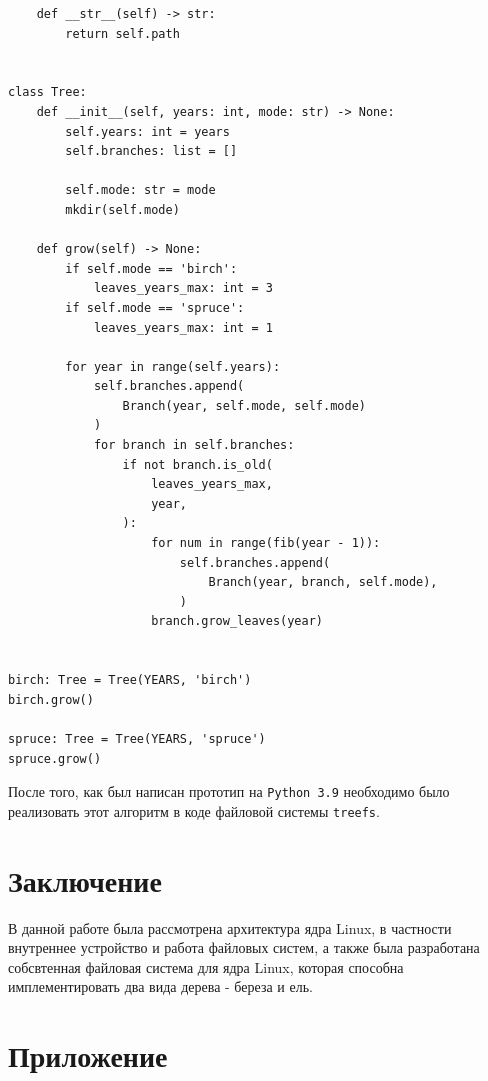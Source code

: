 \documentclass{article}
\begin{document}
\begin{lstlisting}
    def __str__(self) -> str:
        return self.path


class Tree:
    def __init__(self, years: int, mode: str) -> None:
        self.years: int = years
        self.branches: list = []

        self.mode: str = mode
        mkdir(self.mode)
    
    def grow(self) -> None:
        if self.mode == 'birch':
            leaves_years_max: int = 3
        if self.mode == 'spruce':
            leaves_years_max: int = 1
        
        for year in range(self.years):
            self.branches.append(
                Branch(year, self.mode, self.mode)
            )
            for branch in self.branches:
                if not branch.is_old(
                    leaves_years_max, 
                    year,
                ):
                    for num in range(fib(year - 1)):
                        self.branches.append(
                            Branch(year, branch, self.mode),
                        )
                    branch.grow_leaves(year)

    
birch: Tree = Tree(YEARS, 'birch')
birch.grow()

spruce: Tree = Tree(YEARS, 'spruce')
spruce.grow()
    \end{lstlisting}

    После того, как был написан прототип на \texttt{Python 3.9} необходимо было
    реализовать этот алгоритм в коде файловой системы \texttt{treefs}.

    \section{Заключение}
    В данной работе была рассмотрена архитектура ядра Linux, в частности
    внутреннее устройство и работа файловых систем, а также была разработана
    собсвтенная файловая система для ядра Linux, которая способна имплементировать
    два вида дерева - береза и ель.

    \begin{thebibliography}{99}
    \end{thebibliography}

    \section{Приложение}
\end{document}
